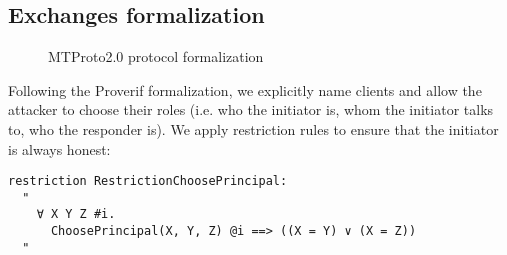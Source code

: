\subsection{Exchanges formalization}
\begin{figure}[!t]
  \setlength{\instdist}{3cm}
  \setmscoptions
  \begin{msc}{}



    \nextlevel[7]
    \nextlevel


    \nextlevel[6]
    \nextlevel


    \nextlevel[3]
    \nextlevel[4]

  \end{msc}

  \centering
  \caption{MTProto2.0 \Schat{} protocol formalization}
  \label{fig:secret-chat-protocol-formalization}
\end{figure}

Following the Proverif formalization, we explicitly name clients and allow the attacker to choose their roles (i.e. who the initiator is, whom the initiator talks to, who the responder is). We apply restriction rules to ensure that the initiator is always honest: %

\begin{lstlisting}
restriction RestrictionChoosePrincipal:
  "
    ∀ X Y Z #i.
      ChoosePrincipal(X, Y, Z) @i ==> ((X = Y) ∨ (X = Z))
  "
\end{lstlisting}

